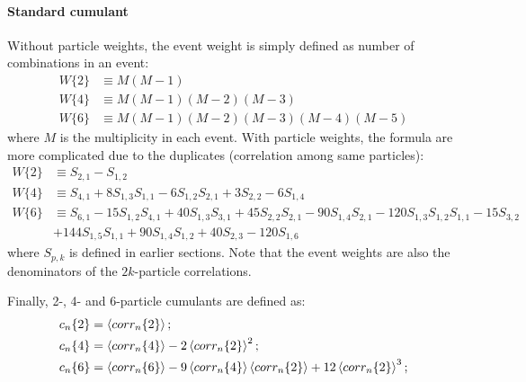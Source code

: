 \paragraph{Standard cumulant}
Without particle weights, the event weight is simply defined as number of combinations in an event:
\begin{equation}
\begin{split}
W\{2\}&\equiv M(M-1) \\
W\{4\}&\equiv M(M-1)(M-2)(M-3) \\
W\{6\}&\equiv M(M-1)(M-2)(M-3)(M-4)(M-5)
\end{split}
\end{equation}
where $M$ is the multiplicity in each event. With particle weights, the formula are more complicated due to the duplicates (correlation among same particles):
\begin{equation}
\begin{split}
W\{2\}&\equiv S_{2,1}-S_{1,2} \\
W\{4\}&\equiv S_{4,1}+8S_{1,3}S_{1,1}-6S_{1,2}S_{2,1}+3S_{2,2}-6S_{1,4} \\
W\{6\}&\equiv S_{6,1}-15S_{1,2}S_{4,1}+40S_{1,3}S_{3,1}+45S_{2,2}S_{2,1}-90S_{1,4}S_{2,1}-120S_{1,3}S_{1,2}S_{1,1}-15S_{3,2} \\
&+144S_{1,5}S_{1,1}+90S_{1,4}S_{1,2}+40S_{2,3}-120S_{1,6}
\end{split}
\end{equation}
where $S_{p,k}$ is defined in earlier sections. Note that the event weights are also the denominators of the $2k$-particle correlations.

Finally, 2-, 4- and 6-particle cumulants are defined as:
\begin{equation}
\begin{split}
c_n\{2\}&= \left\langle corr_n\{2\}\right\rangle; \\
c_n\{4\}&= \left\langle corr_n\{4\}\right\rangle-2\left\langle corr_n\{2\}\right\rangle^2; \\
c_n\{6\}&= \left\langle corr_n\{6\}\right\rangle-9\left\langle corr_n\{4\}\right\rangle\left\langle corr_n\{2\}\right\rangle+12\left\langle corr_n\{2\}\right\rangle^3;
\end{split}
\end{equation}



